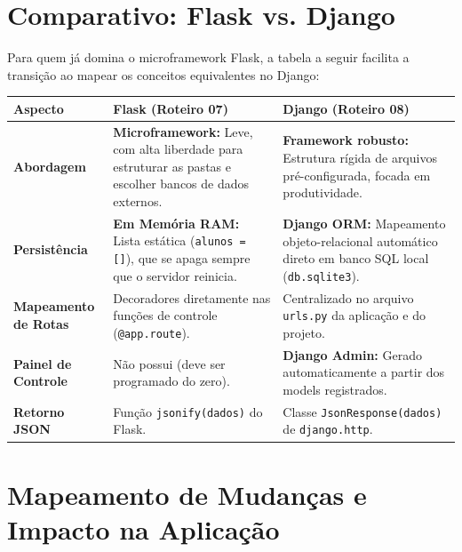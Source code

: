 \documentclass[12pt,a4paper]{article}
\begin{document}
\newpage

\section{Comparativo: Flask vs. Django}

Para quem já domina o microframework Flask, a tabela a seguir facilita a transição ao mapear os conceitos equivalentes no Django:

\vspace{0.3cm}
\begin{center}
\small
\renewcommand{\arraystretch}{1.4}
\begin{tabularx}{\linewidth}{|p{3.5cm}|X|X|}
\hline
\rowcolor{azulTitulo}
\color{white}\textbf{Aspecto} & 
\color{white}\textbf{Flask (Roteiro 07)} & 
\color{white}\textbf{Django (Roteiro 08)} \\ \hline

\textbf{Abordagem} & 
\textbf{Microframework:} Leve, com alta liberdade para estruturar as pastas e escolher bancos de dados externos. & 
\textbf{Framework robusto:} Estrutura rígida de arquivos pré-configurada, focada em produtividade. \\ \hline

\textbf{Persistência} & 
\textbf{Em Memória RAM:} Lista estática (\texttt{alunos = []}), que se apaga sempre que o servidor reinicia. & 
\textbf{Django ORM:} Mapeamento objeto-relacional automático direto em banco SQL local (\texttt{db.sqlite3}). \\ \hline

\textbf{Mapeamento de Rotas} & 
Decoradores diretamente nas funções de controle (\texttt{@app.route}). & 
Centralizado no arquivo \texttt{urls.py} da aplicação e do projeto. \\ \hline

\textbf{Painel de Controle} & 
Não possui (deve ser programado do zero). & 
\textbf{Django Admin:} Gerado automaticamente a partir dos models registrados. \\ \hline

\textbf{Retorno JSON} & 
Função \texttt{jsonify(dados)} do Flask. & 
Classe \texttt{JsonResponse(dados)} de \texttt{django.http}. \\ \hline
\end{tabularx}
\end{center}

\section{Mapeamento de Mudanças e Impacto na Aplicação}
\end{document}
